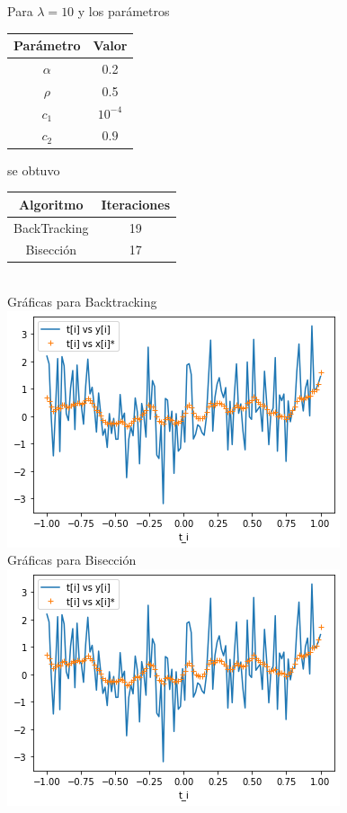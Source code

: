 \documentclass[11pt,letterpaper]{article}
\theoremstyle{definition}
\theoremstyle{definition}
\theoremstyle{definition}
\begin{document}
Para $ \lambda = 10 $ y los parámetros
\begin{center}
	\begin{tabular}{cc}
		\hline
		Parámetro & Valor \\
		\hline
		$\alpha $ & 0.2 \\
		$ \rho $  & 0.5 \\
		$ c_1 $ & $ 10^{-4} $ \\
		$ c_2 $  & $ 0.9 $ \\
		\hline
	\end{tabular}
\end{center}
se obtuvo
\begin{center}
	\begin{tabular}{cc}
		\hline
		Algoritmo & Iteraciones \\
		\hline
		BackTracking & 19 \\
		Bisección    & 17 \\
		\hline
	\end{tabular}
	\\
	Gráficas para Backtracking
	\\
	\includegraphics[width=0.8\linewidth]{graficas/f3_backtracking_lambda10}
	\\
	Gráficas para Bisección
	\\
	\includegraphics[width=0.8\linewidth]{graficas/f3_bisection_lambda10}
\end{center}
\end{document}
